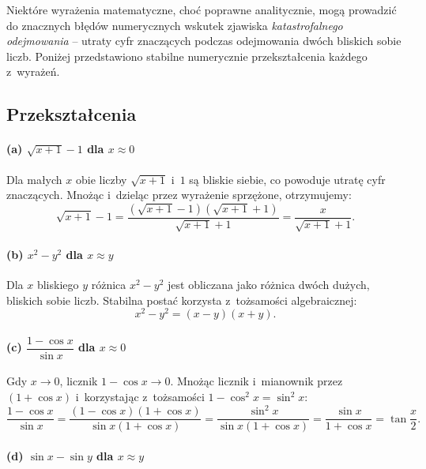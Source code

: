\documentclass[12pt, a4paper]{article}
\begin{document}
Niektóre wyrażenia matematyczne, choć poprawne analitycznie, mogą prowadzić do znacznych błędów numerycznych wskutek zjawiska \emph{katastrofalnego odejmowania} -- utraty cyfr znaczących podczas odejmowania dwóch bliskich sobie liczb. Poniżej przedstawiono stabilne numerycznie przekształcenia każdego z~wyrażeń.

\subsection{Przekształcenia}

\paragraph{(a) $\sqrt{x+1} - 1$ dla $x \approx 0$}

Dla małych $x$ obie liczby $\sqrt{x+1}$ i~$1$ są bliskie siebie, co powoduje utratę cyfr znaczących. Mnożąc i~dzieląc przez wyrażenie sprzężone, otrzymujemy:
\begin{equation}
  \sqrt{x+1} - 1 = \frac{(\sqrt{x+1}-1)(\sqrt{x+1}+1)}{\sqrt{x+1}+1} = \frac{x}{\sqrt{x+1}+1}.
\end{equation}

\paragraph{(b) $x^2 - y^2$ dla $x \approx y$}

Dla $x$ bliskiego $y$ różnica $x^2 - y^2$ jest obliczana jako różnica dwóch dużych, bliskich sobie liczb. Stabilna postać korzysta z~tożsamości algebraicznej:
\begin{equation}
  x^2 - y^2 = (x - y)(x + y).
\end{equation}

\paragraph{(c) $\dfrac{1 - \cos x}{\sin x}$ dla $x \approx 0$}

Gdy $x \to 0$, licznik $1 - \cos x \to 0$. Mnożąc licznik i~mianownik przez $(1 + \cos x)$ i~korzystając z~tożsamości $1 - \cos^2 x = \sin^2 x$:
\begin{equation}
  \frac{1 - \cos x}{\sin x} = \frac{(1 - \cos x)(1 + \cos x)}{\sin x (1 + \cos x)} = \frac{\sin^2 x}{\sin x (1 + \cos x)} = \frac{\sin x}{1 + \cos x} = \tan\frac{x}{2}.
\end{equation}

\paragraph{(d) $\sin x - \sin y$ dla $x \approx y$}
\end{document}

